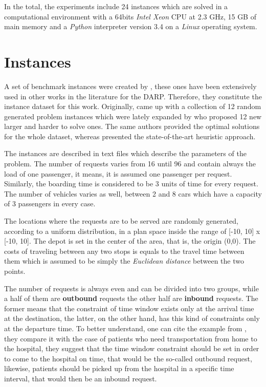 \documentclass[tuberlin,cic,tc,openright,english,noabntcite,oneside]{iiufrgs}
\begin{document}
In the total, the experiments include 24 instances which are solved in a computational environment with a 64bits \emph{Intel Xeon} CPU at 2.3 GHz, 15 GB of main memory and a \emph{Python} interpreter version 3.4 on a \emph{Linux} operating system.

\section{Instances}
A set of benchmark instances were created by \textcite{cordeau_branch-and-cut_2006}, these ones have been extensively used in other works in the literature for the DARP. Therefore, they constitute the instance dataset for this work. Originally, \textcite{cordeau_branch-and-cut_2006} came up with a collection of 12 random generated problem instances which were lately expanded by \textcite{ropke_models_2007} who proposed 12 new larger and harder to solve ones. The same authors provided the optimal solutions for the whole dataset, whereas \textcite{parragh_hybrid_2013} presented the state-of-the-art heuristic approach.

The instances are described in text files which describe the parameters of the problem. The number of requests varies from 16 until 96 and contain always the load of one passenger, it means, it is assumed one passenger per request. Similarly, the boarding time is considered to be 3 units of time for every request. The number of vehicles varies as well, between 2 and 8 cars which have a capacity of 3 passengers in every case.

The locations where the requests are to be served are randomly generated, according to a uniform distribution, in a plan space inside the range of [-10, 10] x [-10, 10]. The depot is set in the center of the area, that is, the origin (0,0). The costs of traveling between any two stops is equals to the travel time between them which is assumed to be simply the \emph{Euclidean distance} between the two points.

The number of requests is always even and can be divided into two groups, while a half of them are \textbf{outbound} requests the other half are \textbf{inbound} requests. The former means that the constraint of time window exists only at the arrival time at the destination, the latter, on the other hand, has this kind of constraints only at the departure time. To better understand, one can cite the example from \textcite[p. 29]{cordeau_dial--ride_2007}, they compare it with the case of patients who need transportation from home to the hospital, they suggest that the time window constraint should be set in order to come to the hospital on time, that would be the so-called outbound request, likewise, patients should be picked up from the hospital in a specific time interval, that would then be an inbound request.
\end{document}

